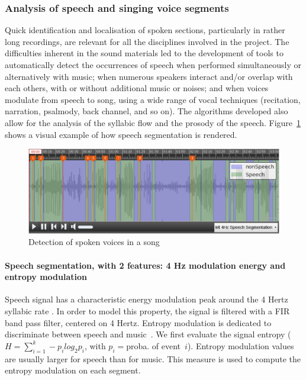 \documentclass{sig-alternate}
\newcommand{\squeezeup}{\vspace{-2.5mm}}
\begin{document}
\subsubsection{Analysis of speech and singing voice segments}
Quick identification and localisation of spoken sections, particularly in rather long recordings, are relevant for all the disciplines involved in the project. The difficulties inherent in the sound materials led to the development of tools to automatically detect the occurrences of speech when performed simultaneously or alternatively with music; when numerous speakers interact and/or overlap with each others, with or without additional music or noises; and when voices modulate from speech to song, using a wide range of vocal techniques (recitation, narration, psalmody, back channel, and so on). The algorithms developed also allow for the analysis of the syllabic flow and the prosody of the speech. 
Figure~\ref{fig:speech_detection} shows a visual example of how speech segmentation is rendered.

\begin{figure}[htb]
  \centering
 \includegraphics[width=\linewidth]{img/IRIT_Speech4Hz.png} 
  \caption{Detection of spoken voices in a song}
  \label{fig:speech_detection}
\end{figure}

\squeezeup\paragraph{Speech segmentation, with 2 features: 4 Hz modulation energy and entropy modulation} 
Speech signal has a characteristic energy modulation peak around the 4 Hertz syllabic rate \cite{Houtgast1985}. In order to model this property, the signal is filtered with a FIR band pass filter, centered on 4 Hertz.
Entropy modulation is dedicated to discriminate between speech and music~\cite{Pinquier2003}. We first evaluate the signal entropy ($H=\sum_{i=1}^{k}-p_ilog_2p_i$, with $p_i=$proba. of event~$i$). Entropy modulation values are usually larger for speech than for music. This measure is used to compute the entropy modulation on each segment. 
\end{document}
